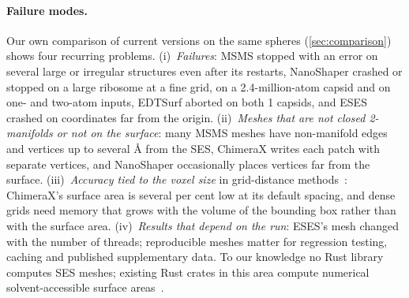 \paragraph{Failure modes.}
Our own comparison of current versions on the same spheres
(\cref{sec:comparison}) shows four recurring problems.
(i)~\emph{Failures}: MSMS stopped with an error on several large or
irregular structures even after its restarts, NanoShaper crashed or stopped
on a large ribosome at a fine grid, on a 2.4-million-atom capsid and on one-
and two-atom inputs, EDTSurf aborted on both 1\Ang{} capsids, and ESES
crashed on coordinates far from the origin.
(ii)~\emph{Meshes that are not closed 2-manifolds or not on the surface}:
many MSMS meshes have non-manifold edges and vertices up to several \AA{}
from the SES, ChimeraX writes each patch with separate vertices, and
NanoShaper occasionally places vertices far from the surface.
(iii)~\emph{Accuracy tied to the voxel size} in grid-distance
methods~\cite{xu2009edtsurf}: ChimeraX's surface area is several per cent
low at its default spacing, and dense grids need memory that grows with the
volume of the bounding box rather than with the surface area.
(iv)~\emph{Results that depend on the run}: ESES's mesh changed with the
number of threads; reproducible meshes matter for regression testing,
caching and published supplementary data.
To our knowledge no Rust library computes SES meshes; existing Rust crates
in this area compute numerical solvent-accessible surface
areas~\cite{rustsasa}.

